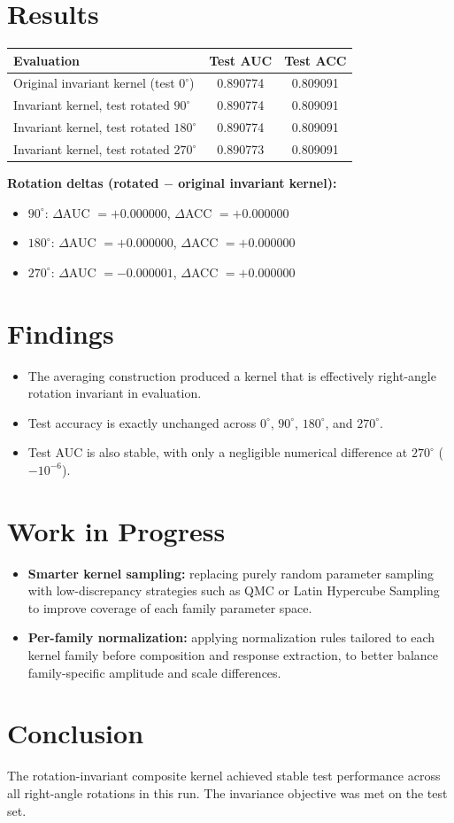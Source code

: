 \documentclass{article}
\begin{document}
\section*{Results}
\begin{center}
\begin{tabular}{lcc}
\toprule
Evaluation & Test AUC & Test ACC \\
\midrule
Original invariant kernel (test $0^\circ$) & 0.890774 & 0.809091 \\
Invariant kernel, test rotated $90^\circ$ & 0.890774 & 0.809091 \\
Invariant kernel, test rotated $180^\circ$ & 0.890774 & 0.809091 \\
Invariant kernel, test rotated $270^\circ$ & 0.890773 & 0.809091 \\
\bottomrule
\end{tabular}
\end{center}

\vspace{0.5em}
\textbf{Rotation deltas (rotated $-$ original invariant kernel):}
\begin{itemize}
    \item $90^\circ$: $\Delta$AUC $= +0.000000$, $\Delta$ACC $= +0.000000$
    \item $180^\circ$: $\Delta$AUC $= +0.000000$, $\Delta$ACC $= +0.000000$
    \item $270^\circ$: $\Delta$AUC $= -0.000001$, $\Delta$ACC $= +0.000000$
\end{itemize}

\section*{Findings}
\begin{itemize}
    \item The averaging construction produced a kernel that is effectively right-angle rotation invariant in evaluation.
    \item Test accuracy is exactly unchanged across $0^\circ$, $90^\circ$, $180^\circ$, and $270^\circ$.
    \item Test AUC is also stable, with only a negligible numerical difference at $270^\circ$ ($-10^{-6}$).
\end{itemize}

\section*{Work in Progress}
\begin{itemize}
    \item \textbf{Smarter kernel sampling:} replacing purely random parameter sampling with low-discrepancy strategies such as QMC or Latin Hypercube Sampling to improve coverage of each family parameter space.
    \item \textbf{Per-family normalization:} applying normalization rules tailored to each kernel family before composition and response extraction, to better balance family-specific amplitude and scale differences.
\end{itemize}

\section*{Conclusion}
The rotation-invariant composite kernel achieved stable test performance across all right-angle rotations in this run. The invariance objective was met on the test set.
\end{document}

